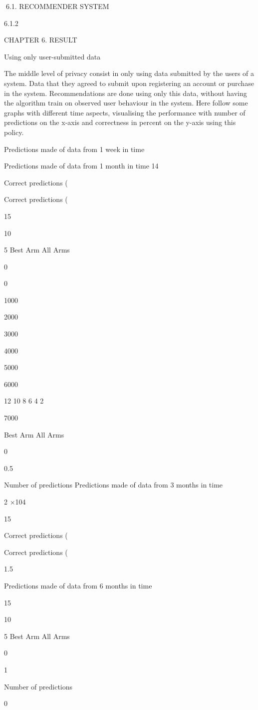 6.1. RECOMMENDER SYSTEM

6.1.2

CHAPTER 6. RESULT

Using only user-submitted data

The middle level of privacy consist in only using data submitted by the users of a system. Data that they agreed to submit upon registering an account or purchase in the
system. Recommendations are done using only this data, without having the algorithm
train on observed user behaviour in the system. Here follow some graphs with different
time aspects, visualising the performance with number of predictions on the x-axis and
correctness in percent on the y-axis using this policy.

Predictions made of data from 1 week in time

Predictions made of data from 1 month in time
14

Correct predictions (%

Correct predictions (%

15

10

5
Best Arm
All Arms

0

0

1000

2000

3000

4000

5000

6000

12
10
8
6
4
2

7000

Best Arm
All Arms

0

0.5

Number of predictions
Predictions made of data from 3 months in time

2
×104

15

Correct predictions (%

Correct predictions (%

1.5

Predictions made of data from 6 months in time

15

10

5
Best Arm
All Arms

0

1

Number of predictions

0

